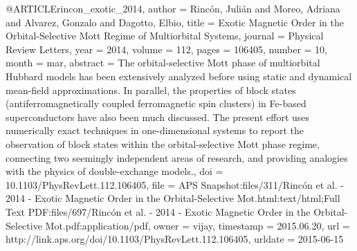 @ARTICLE{rincon_exotic_2014,
  author = {Rincón, Julián and Moreo, Adriana and Alvarez, Gonzalo and Dagotto,
	Elbio},
  title = {Exotic {Magnetic} {Order} in the {Orbital}-{Selective} {Mott} {Regime}
	of {Multiorbital} {Systems}},
  journal = {Physical Review Letters},
  year = {2014},
  volume = {112},
  pages = {106405},
  number = {10},
  month = mar,
  abstract = {The orbital-selective Mott phase of multiorbital Hubbard models has
	been extensively analyzed before using static and dynamical mean-field
	approximations. In parallel, the properties of block states (antiferromagnetically
	coupled ferromagnetic spin clusters) in Fe-based superconductors
	have also been much discussed. The present effort uses numerically
	exact techniques in one-dimensional systems to report the observation
	of block states within the orbital-selective Mott phase regime, connecting
	two seemingly independent areas of research, and providing analogies
	with the physics of double-exchange models.},
  doi = {10.1103/PhysRevLett.112.106405},
  file = {APS Snapshot:files/311/Rincón et al. - 2014 - Exotic Magnetic Order in the Orbital-Selective Mot.html:text/html;Full Text PDF:files/697/Rincón et al. - 2014 - Exotic Magnetic Order in the Orbital-Selective Mot.pdf:application/pdf},
  owner = {vijay},
  timestamp = {2015.06.20},
  url = {http://link.aps.org/doi/10.1103/PhysRevLett.112.106405},
  urldate = {2015-06-15}
}

